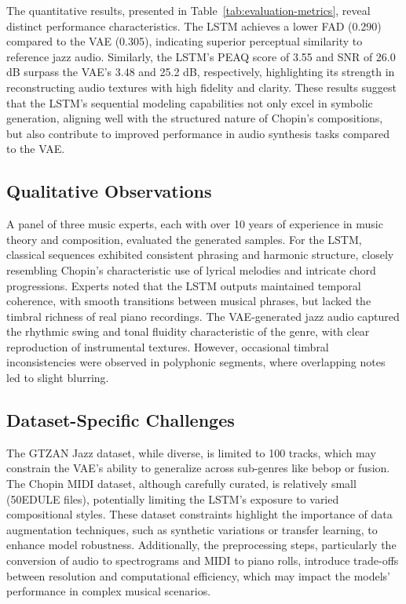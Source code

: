 \documentclass[conference]{IEEEtran}
\begin{document}
The quantitative results, presented in Table~\ref{tab:evaluation-metrics}, reveal distinct performance characteristics. The LSTM achieves a lower FAD (0.290) compared to the VAE (0.305), indicating superior perceptual similarity to reference jazz audio. Similarly, the LSTM’s PEAQ score of 3.55 and SNR of 26.0 dB surpass the VAE’s 3.48 and 25.2 dB, respectively, highlighting its strength in reconstructing audio textures with high fidelity and clarity. These results suggest that the LSTM’s sequential modeling capabilities not only excel in symbolic generation, aligning well with the structured nature of Chopin’s compositions, but also contribute to improved performance in audio synthesis tasks compared to the VAE.

\subsection{Qualitative Observations}
A panel of three music experts, each with over 10 years of experience in music theory and composition, evaluated the generated samples. For the LSTM, classical sequences exhibited consistent phrasing and harmonic structure, closely resembling Chopin’s characteristic use of lyrical melodies and intricate chord progressions. Experts noted that the LSTM outputs maintained temporal coherence, with smooth transitions between musical phrases, but lacked the timbral richness of real piano recordings. The VAE-generated jazz audio captured the rhythmic swing and tonal fluidity characteristic of the genre, with clear reproduction of instrumental textures. However, occasional timbral inconsistencies were observed in polyphonic segments, where overlapping notes led to slight blurring.

\subsection{Dataset-Specific Challenges}
The GTZAN Jazz dataset, while diverse, is limited to 100 tracks, which may constrain the VAE’s ability to generalize across sub-genres like bebop or fusion. The Chopin MIDI dataset, although carefully curated, is relatively small (50EDULE files), potentially limiting the LSTM’s exposure to varied compositional styles. These dataset constraints highlight the importance of data augmentation techniques, such as synthetic variations or transfer learning, to enhance model robustness. Additionally, the preprocessing steps, particularly the conversion of audio to spectrograms and MIDI to piano rolls, introduce trade-offs between resolution and computational efficiency, which may impact the models’ performance in complex musical scenarios.
\end{document}

